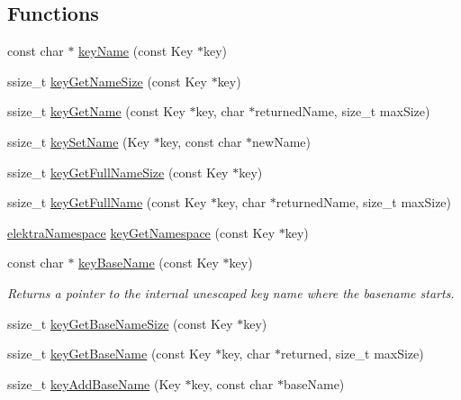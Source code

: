 \subsection*{Functions}
\begin{DoxyCompactItemize}
\item 
const char $\ast$ \hyperlink{group__keyname_ga8e805c726a60da921d3736cda7813513}{key\-Name} (const Key $\ast$key)
\item 
ssize\-\_\-t \hyperlink{group__keyname_gabdbcfa51ed8a387e47ead207affa2d2e}{key\-Get\-Name\-Size} (const Key $\ast$key)
\item 
ssize\-\_\-t \hyperlink{group__keyname_gab29a850168d9b31c9529e90cf9ab68be}{key\-Get\-Name} (const Key $\ast$key, char $\ast$returned\-Name, size\-\_\-t max\-Size)
\item 
ssize\-\_\-t \hyperlink{group__keyname_ga7699091610e7f3f43d2949514a4b35d9}{key\-Set\-Name} (Key $\ast$key, const char $\ast$new\-Name)
\item 
ssize\-\_\-t \hyperlink{group__keyname_gab65dc9d43d3ee08d5e936a20ebbddd23}{key\-Get\-Full\-Name\-Size} (const Key $\ast$key)
\item 
ssize\-\_\-t \hyperlink{group__keyname_gaaba1494a5ffc976e0e56c43f4334a23c}{key\-Get\-Full\-Name} (const Key $\ast$key, char $\ast$returned\-Name, size\-\_\-t max\-Size)
\item 
\hyperlink{group__keyname_gaec3b8d6f430ae49b91bafe8a86310a68}{elektra\-Namespace} \hyperlink{group__keyname_gafc3ca03ed10f87eb59bdc02cf2a0de8d}{key\-Get\-Namespace} (const Key $\ast$key)
\item 
const char $\ast$ \hyperlink{group__keyname_gaaff35e7ca8af5560c47e662ceb9465f5}{key\-Base\-Name} (const Key $\ast$key)
\begin{DoxyCompactList}\small\item\em Returns a pointer to the internal unescaped key name where the {\ttfamily basename} starts. \end{DoxyCompactList}\item 
ssize\-\_\-t \hyperlink{group__keyname_ga1a0b76c5d9e5367c7e72211e6c63d43a}{key\-Get\-Base\-Name\-Size} (const Key $\ast$key)
\item 
ssize\-\_\-t \hyperlink{group__keyname_ga0992d26bcfca767cb8e77053a483eb64}{key\-Get\-Base\-Name} (const Key $\ast$key, char $\ast$returned, size\-\_\-t max\-Size)
\item 
ssize\-\_\-t \hyperlink{group__keyname_gaa942091fc4bd5c2699e49ddc50829524}{key\-Add\-Base\-Name} (Key $\ast$key, const char $\ast$base\-Name)
\item 

\end{DoxyCompactItemize}
